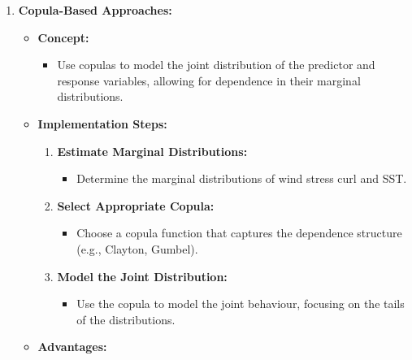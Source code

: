 \documentclass[
  letterpaper,
]{book}
\providecommand{\tightlist}{%
  \setlength{\itemsep}{0pt}\setlength{\parskip}{0pt}}\usepackage{longtable,booktabs,array}
\begin{document}
\begin{enumerate}
\begin{itemize}
    \begin{itemize}
    \tightlist
    \item
      \textbf{Model Complexity:} More complex models require careful
      interpretation and validation.
    \item
      \textbf{Overfitting Risk:} Including too many interactions can
      lead to overfitting, especially with limited data.
    \end{itemize}
  \end{itemize}
\item
  \textbf{Copula-Based Approaches:}

  \begin{itemize}
  \tightlist
  \item
    \textbf{Concept:}

    \begin{itemize}
    \tightlist
    \item
      Use copulas to model the joint distribution of the predictor and
      response variables, allowing for dependence in their marginal
      distributions.
    \end{itemize}
  \item
    \textbf{Implementation Steps:}

    \begin{enumerate}
    \def\labelenumii{\arabic{enumii}.}
    \tightlist
    \item
      \textbf{Estimate Marginal Distributions:}

      \begin{itemize}
      \tightlist
      \item
        Determine the marginal distributions of wind stress curl and
        SST.
      \end{itemize}
    \item
      \textbf{Select Appropriate Copula:}

      \begin{itemize}
      \tightlist
      \item
        Choose a copula function that captures the dependence structure
        (e.g., Clayton, Gumbel).
      \end{itemize}
    \item
      \textbf{Model the Joint Distribution:}

      \begin{itemize}
      \tightlist
      \item
        Use the copula to model the joint behaviour, focusing on the
        tails of the distributions.
      \end{itemize}
    \end{enumerate}
  \item
    \textbf{Advantages:}


\end{itemize}
\end{enumerate}
\end{document}
